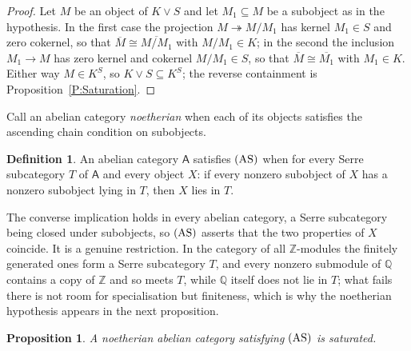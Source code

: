 \documentclass[reqno,a4paper]{amsart}
\numberwithin{equation}{section}
\theoremstyle{plain}
\newtheorem{proposition}[subsection]{Proposition}
\theoremstyle{definition}
\newtheorem{definition}[subsection]{Definition}
\def\nameit#1{\textrm{#1}~}
\def\prox{\nameit{Proposition}}
\def\dfn#1{{\itshape #1}}
\newcommand{\iso}{\cong}
\newcommand{\ov}[1]{\overline{#1}}
\newcommand{\onecat}[1]{\ensuremath{\mathsf{#1}}\xspace}
\renewcommand{\1}{\onecat{1}}
\newcommand{\AS}{\textup{(AS)}}
\newcommand{\toe}{\twoheadrightarrow}
\begin{document}
\begin{proof}
	Let \(M\) be an object of \(K\vee S\) and let \(M_{1}\subseteq M\) be a subobject as in the hypothesis. In the first case the projection \(M\toe M/M_{1}\) has kernel \(M_{1}\in S\) and zero cokernel, so that \(\ov{M}\iso\ov{M/M_{1}}\) with \(M/M_{1}\in K\); in the second the inclusion \(M_{1}\to M\) has zero kernel and cokernel \(M/M_{1}\in S\), so that \(\ov{M}\iso\ov{M_{1}}\) with \(M_{1}\in K\). Either way \(M\in K^{S}\), so \(K\vee S\subseteq K^{S}\); the reverse containment is \prox\ref{P:Saturation}.
\end{proof}

Call an abelian category \dfn{noetherian} when each of its objects satisfies the ascending chain condition on subobjects.

\begin{definition}\label{D:AS}
	An abelian category \(\onecat{A}\) satisfies \(\AS\) when for every Serre subcategory \(T\) of \(\onecat{A}\) and every object \(X\): if every nonzero subobject of \(X\) has a nonzero subobject lying in \(T\), then \(X\) lies in \(T\).
\end{definition}

The converse implication holds in every abelian category, a Serre subcategory being closed under subobjects, so \(\AS\) asserts that the two properties of \(X\) coincide. It is a genuine restriction. In the category of all \(\mathbb{Z}\)-modules the finitely generated ones form a Serre subcategory \(T\), and every nonzero submodule of \(\mathbb{Q}\) contains a copy of \(\mathbb{Z}\) and so meets \(T\), while \(\mathbb{Q}\) itself does not lie in \(T\); what fails there is not room for specialisation but finiteness, which is why the noetherian hypothesis appears in the next proposition.

\begin{proposition}\label{P:ASimplies}
	A noetherian abelian category satisfying \(\AS\) is saturated.
\end{proposition}
\end{document}
